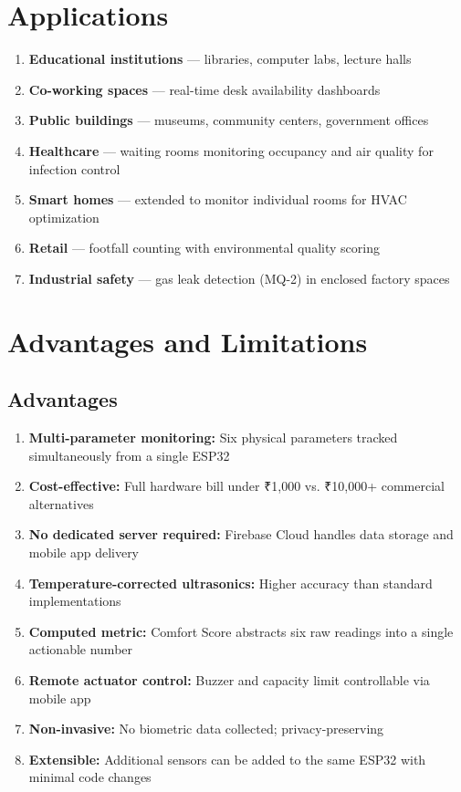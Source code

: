 \documentclass[12pt,a4paper]{article}
\begin{document}
\newpage

\section{Applications}

\begin{enumerate}[leftmargin=1.5cm]
  \item \textbf{Educational institutions} — libraries, computer labs, lecture halls
  \item \textbf{Co-working spaces} — real-time desk availability dashboards
  \item \textbf{Public buildings} — museums, community centers, government offices
  \item \textbf{Healthcare} — waiting rooms monitoring occupancy and air quality for infection control
  \item \textbf{Smart homes} — extended to monitor individual rooms for HVAC optimization
  \item \textbf{Retail} — footfall counting with environmental quality scoring
  \item \textbf{Industrial safety} — gas leak detection (MQ-2) in enclosed factory spaces
\end{enumerate}

\newpage

\section{Advantages and Limitations}

\subsection{Advantages}

\begin{enumerate}[leftmargin=1.5cm]
  \item \textbf{Multi-parameter monitoring:} Six physical parameters tracked simultaneously from a single ESP32
  \item \textbf{Cost-effective:} Full hardware bill under ₹1,000 vs. ₹10,000+ commercial alternatives
  \item \textbf{No dedicated server required:} Firebase Cloud handles data storage and mobile app delivery
  \item \textbf{Temperature-corrected ultrasonics:} Higher accuracy than standard implementations
  \item \textbf{Computed metric:} Comfort Score abstracts six raw readings into a single actionable number
  \item \textbf{Remote actuator control:} Buzzer and capacity limit controllable via mobile app
  \item \textbf{Non-invasive:} No biometric data collected; privacy-preserving
  \item \textbf{Extensible:} Additional sensors can be added to the same ESP32 with minimal code changes
\end{enumerate}
\end{document}

